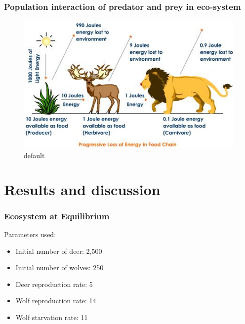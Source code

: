 \documentclass{beamer}
\begin{document}
\frame
{
	\frametitle{Population interaction of predator and prey in eco-system}

	\begin{figure}[htbp]
	\begin{center}
	\includegraphics[width=1\textwidth]{./pics/progressive-energy-loss.jpeg}
	\caption{default}
	\label{default}
	\end{center}
	\end{figure}
}


\section{Results and discussion}
\frame
{
  \frametitle{Ecosystem at Equilibrium}
  Parameters used: 
  \begin{itemize}
  \item{Initial number of deer: 2,500}
  \item{Initial number of wolves: 250}
  \item{Deer reproduction rate: 5}
  \item{Wolf reproduction rate: 14}
  \item{Wolf starvation rate: 11}
  \end{itemize}

}
\end{document}
